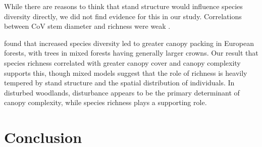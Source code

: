 \documentclass[11pt,a4paper]{article}
\newcommand{\beginsupplement}{%
	\setcounter{table}{0}
	\renewcommand{\thetable}{S\arabic{table}}%
	\setcounter{figure}{0}
	\renewcommand{\thefigure}{S\arabic{figure}}%
}
\begin{document}
While there are reasons to think that stand structure would influence species diversity directly, we did not find evidence for this in our study. Correlations between CoV stem diameter and richness were weak .


\citet{Jucker2015} found that increased species diversity led to greater canopy packing in European forests, with trees in mixed forests having generally larger crowns. Our result that species richness correlated with greater canopy cover and canopy complexity supports this, though mixed models suggest that the role of richness is heavily tempered by stand structure and the spatial distribution of individuals. In disturbed woodlands, disturbance appears to be the primary determinant of canopy complexity, while species richness plays a supporting role.

\section{Conclusion}

\printbibliography

\end{document}
